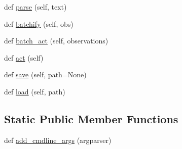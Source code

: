 \begin{DoxyCompactItemize}
\item 
def \hyperlink{classagent_1_1memnn__feedback_1_1MemnnFeedbackAgent_a4decbb76deb6205e546de7e4ae09a774}{parse} (self, text)
\item 
def \hyperlink{classagent_1_1memnn__feedback_1_1MemnnFeedbackAgent_a901865f6607e3b5509831785bc1e29d0}{batchify} (self, obs)
\item 
def \hyperlink{classagent_1_1memnn__feedback_1_1MemnnFeedbackAgent_a0988c186c27ab70d318ea30e39a0a5cc}{batch\+\_\+act} (self, observations)
\item 
def \hyperlink{classagent_1_1memnn__feedback_1_1MemnnFeedbackAgent_ab221141e0a956be465e718bb349e7554}{act} (self)
\item 
def \hyperlink{classagent_1_1memnn__feedback_1_1MemnnFeedbackAgent_adfcb2f89323d006b22e84613e35c7a3c}{save} (self, path=None)
\item 
def \hyperlink{classagent_1_1memnn__feedback_1_1MemnnFeedbackAgent_a1d616b4215665efb7df23f0477850827}{load} (self, path)
\end{DoxyCompactItemize}
\subsection*{Static Public Member Functions}
\begin{DoxyCompactItemize}
\item 
def \hyperlink{classagent_1_1memnn__feedback_1_1MemnnFeedbackAgent_a401db6d492dd4f48a0a6a0d363fe748b}{add\+\_\+cmdline\+\_\+args} (argparser)
\end{DoxyCompactItemize}
